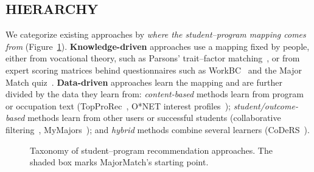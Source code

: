 \documentclass[sigconf]{acmart}
\begin{document}
\subsection{HIERARCHY}
We categorize existing approaches by \emph{where the student--program mapping comes from} (Figure~\ref{fig:hierarchy}). \textbf{Knowledge-driven} approaches use a mapping fixed by people, either from vocational theory, such as Parsons' trait--factor matching~\cite{parsons}, or from expert scoring matrices behind questionnaires such as WorkBC~\cite{workbc} and the Major Match quiz~\cite{majormatch}. \textbf{Data-driven} approaches learn the mapping and are further divided by the data they learn from: \emph{content-based} methods learn from program or occupation text (TopProRec~\cite{hill}, O*NET interest profiles~\cite{javalagi}); \emph{student/outcome-based} methods learn from other users or successful students (collaborative filtering~\cite{resnick1994}, MyMajors~\cite{mymajors}); and \emph{hybrid} methods combine several learners (CoDeRS~\cite{rances}).

\begin{figure}[t]
\centering
{}
\caption{Taxonomy of student--program recommendation approaches. The shaded box marks MajorMatch's starting point.}
\label{fig:hierarchy}
\end{figure}
\end{document}
